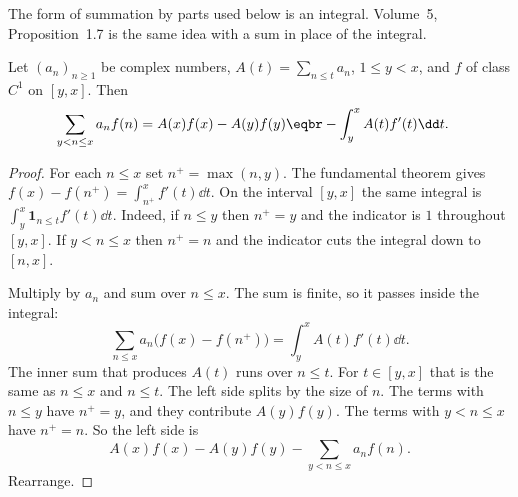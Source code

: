 The form of summation by parts used below is an integral. Volume~5, Proposition~1.7 is the same idea with a sum in place of the integral.

\begin{lemma}\label{lem:abelint}
Let $(a_n)_{n\ge 1}$ be complex numbers, $A(t)=\sum_{n\le t}a_n$, $1\le y<x$, and $f$ of class $C^1$ on $[y,x]$. Then
\[
\begin{aligned}\sum_{y<n\le x}a_nf(n)&=A(x)f(x)-A(y)f(y)\eqbr-\int_y^x A(t)f'(t)\dd t.\end{aligned}
\]
\end{lemma}
\begin{proof}
For each $n\le x$ set $n^+=\max(n,y)$. The fundamental theorem gives $f(x)-f(n^+)=\int_{n^+}^x f'(t)\dd t$. On the interval $[y,x]$ the same integral is $\int_y^x\mathbf 1_{n\le t}f'(t)\dd t$. Indeed, if $n\le y$ then $n^+=y$ and the indicator is $1$ throughout $[y,x]$. If $y<n\le x$ then $n^+=n$ and the indicator cuts the integral down to $[n,x]$.

Multiply by $a_n$ and sum over $n\le x$. The sum is finite, so it passes inside the integral:
\[
\sum_{n\le x}a_n\bigl(f(x)-f(n^+)\bigr)=\int_y^x A(t)f'(t)\dd t.
\]
The inner sum that produces $A(t)$ runs over $n\le t$. For $t\in[y,x]$ that is the same as $n\le x$ and $n\le t$. The left side splits by the size of $n$. The terms with $n\le y$ have $n^+=y$, and they contribute $A(y)f(y)$. The terms with $y<n\le x$ have $n^+=n$. So the left side is
\[
A(x)f(x)-A(y)f(y)-\sum_{y<n\le x}a_nf(n).
\]
Rearrange.
\end{proof}

